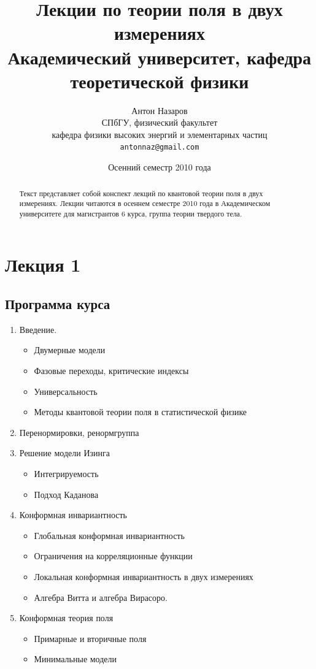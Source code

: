 \documentclass[a4paper,12pt]{article}
\title{Лекции по теории поля в двух измерениях\\
\small{Академический университет, кафедра теоретической физики}
}
\author{Антон Назаров\\
  \small{СПбГУ, физический факультет}\\
  \small{кафедра физики высоких энергий и элементарных частиц}\\
  \texttt{antonnaz@gmail.com}
}
\date{Осенний семестр 2010 года}
\theoremstyle{definition}
\theoremstyle{definition}
\theoremstyle{definition}
\begin{document}
\maketitle
\thispagestyle{empty}
\begin{abstract}
  Текст представляет собой конспект лекций по квантовой теории поля в двух измерениях. Лекции читаются в осеннем семестре 2010 года в Академическом университете для магистрантов 6 курса, группа теории твердого тела. 
\end{abstract}
\tableofcontents

\section{Лекция 1}
\label{sec:lecture-1}

\subsection{Программа курса}
\label{sec:program}
\begin{enumerate}
\item Введение.
  \begin{itemize}
  \item Двумерные модели
  \item Фазовые переходы, критические индексы
  \item Универсальность
  \item Методы квантовой теории поля в статистической физике
  \end{itemize}
\item Перенормировки, ренормгруппа
\item Решение модели Изинга
  \begin{itemize}
  \item Интегрируемость
  \item Подход Каданова
  \end{itemize}
\item Конформная инвариантность
  \begin{itemize}
  \item Глобальная конформная инвариантность
  \item Ограничения на корреляционные функции
  \item Локальная конформная инвариантность в двух измерениях
  \item Алгебра Витта и алгебра Вирасоро.
  \end{itemize}
\item Конформная теория поля
  \begin{itemize}
  \item Примарные и вторичные поля
  \item Минимальные модели
  \end{itemize}
\end{enumerate}
\end{document}
